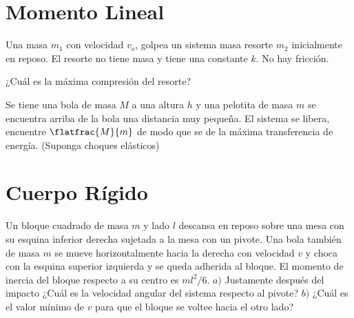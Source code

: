 \section*{Momento Lineal}

\begin{ejercicio}
		Una masa $m_1$ con velocidad $v_o$, golpea un sistema masa resorte $m_2$ inicialmente en reposo. El resorte no tiene masa y tiene una constante $k$. No hay fricción. \\
		\begin{center}
			
		\end{center}
		¿Cuál es la máxima compresión del resorte?
	\end{ejercicio}
	
	
	
\begin{ejercicio}
		Se tiene una bola de masa $M$ a una altura $h$ y una pelotita de masa $m$ se encuentra arriba de la bola una distancia muy pequeña. El sistema se libera, encuentre $\flatfrac{M}{m}$ de modo que se de la máxima transferencia de energía. (Suponga choques elásticos)
	\end{ejercicio}	
	
	
	
	
	
	
	
	
\section*{Cuerpo Rígido}

\begin{ejercicio}
	Un bloque cuadrado de masa $m$ y lado $l$ descansa en reposo sobre una mesa con su esquina inferior derecha sujetada a la mesa con un pivote. Una bola también de masa $m$ se mueve horizontalmente hacia la derecha con velocidad $v$ y choca con la esquina superior izquierda y se queda adherida al bloque. El momento de inercia del bloque respecto a su centro es $ml^2 /6$. $a)$ Justamente después del impacto ¿Cuál es la velocidad angular del sistema respecto al pivote? $b)$ ¿Cuál es el valor mínimo de $v$ para que el bloque se voltee hacia el otro lado?
\end{ejercicio}
	
	


